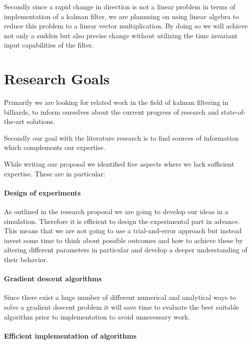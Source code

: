 \documentclass[titlepage, a4paper, 11pt]{scrartcl}
\begin{document}
    Secondly since a rapid change in direction is not a linear problem in terms of implementation of a kalman filter, we are plannning on using linear algebra to reduce this problem 
    to a linear vector multiplication. By doing so we will achieve not only a sudden but also precise change without utilizing the time invariant input capabilities of the filter.

    \section{Research Goals}

    Primarily we are looking for related work in the field of kalman filtering in billiards, to inform ourselves about the current progress of research and state-of-the-art solutions.

    Secondly our goal with the literature research is to find sources of information which complements our expertise. 

    While writing our proposal we identified five aspects where we lack sufficient expertise.
    These are in particular:

        \paragraph{Design of experiments}

        As outlined in the research proposal we are going to develop our ideas in a simulation. Therefore it is efficient to design the experimental part in advance.
        This means that we are not going to use a trial-and-error approach but instead invest some time to think about possible outcomes and how to achieve these by 
        altering different parameters in particular and develop a deeper understanding of their behavior.

        \paragraph{Gradient descent algorithms}

        Since there exist a huge number of different numerical and analytical ways to solve a gradient descent problem it will save time to evaluate the best
        suitable algorithm prior to implementation to avoid unnecessary work.

        \paragraph{Efficient implementation of algorithms}
\end{document}
